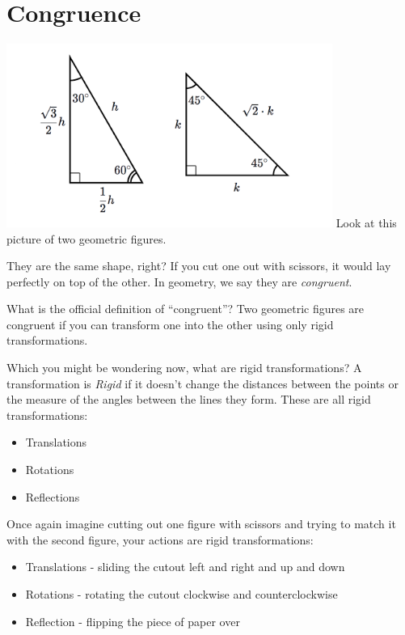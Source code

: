 \chapter{Congruence}
\includegraphics[width=0.8\textwidth]{KA_Special_Triangles.png}
Look at this picture of two geometric figures.


They are the same shape, right? If you cut one out with scissors, it
would lay perfectly on top of the other. In geometry, we say they are
\emph{congruent}.

What is the official definition of ``congruent''? 
Two geometric figures are congruent if you can transform one into the other using
only rigid transformations. 

Which you might be wondering now, what are rigid transformations?
A transformation is \emph{Rigid} if it doesn't change the distances
between the points or the measure of the angles between the lines they
form. These are all rigid transformations:
\begin{itemize}
\item Translations
\item Rotations
\item Reflections 
\end{itemize}

Once again imagine cutting out one figure with scissors and trying to match it with the second figure, your actions are rigid transformations:
\begin{itemize}
\item Translations - sliding the cutout left and right and up and down
\item Rotations	- rotating the cutout clockwise and counterclockwise
\item Reflection - flipping the piece of paper over
\end{itemize}

